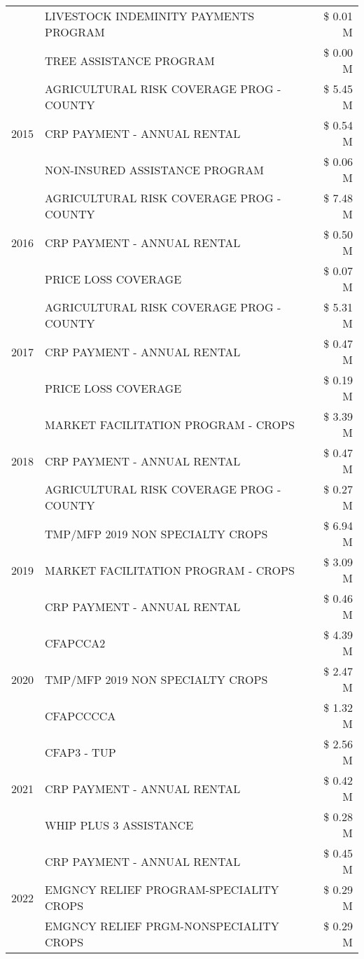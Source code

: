 \begin{tabular}{llr}
 & LIVESTOCK INDEMINITY PAYMENTS PROGRAM & \$ 0.01 M \\
 & TREE ASSISTANCE PROGRAM & \$ 0.00 M \\
\cline{1-3}
\multirow[t]{3}{*}{2015} & AGRICULTURAL RISK COVERAGE PROG - COUNTY & \$ 5.45 M \\
 & CRP PAYMENT - ANNUAL RENTAL & \$ 0.54 M \\
 & NON-INSURED ASSISTANCE PROGRAM & \$ 0.06 M \\
\cline{1-3}
\multirow[t]{3}{*}{2016} & AGRICULTURAL RISK COVERAGE PROG - COUNTY & \$ 7.48 M \\
 & CRP PAYMENT - ANNUAL RENTAL & \$ 0.50 M \\
 & PRICE LOSS COVERAGE & \$ 0.07 M \\
\cline{1-3}
\multirow[t]{3}{*}{2017} & AGRICULTURAL RISK COVERAGE PROG - COUNTY & \$ 5.31 M \\
 & CRP PAYMENT - ANNUAL RENTAL & \$ 0.47 M \\
 & PRICE LOSS COVERAGE & \$ 0.19 M \\
\cline{1-3}
\multirow[t]{3}{*}{2018} & MARKET FACILITATION PROGRAM - CROPS & \$ 3.39 M \\
 & CRP PAYMENT - ANNUAL RENTAL & \$ 0.47 M \\
 & AGRICULTURAL RISK COVERAGE PROG - COUNTY & \$ 0.27 M \\
\cline{1-3}
\multirow[t]{3}{*}{2019} & TMP/MFP 2019 NON SPECIALTY CROPS & \$ 6.94 M \\
 & MARKET FACILITATION PROGRAM - CROPS & \$ 3.09 M \\
 & CRP PAYMENT - ANNUAL RENTAL & \$ 0.46 M \\
\cline{1-3}
\multirow[t]{3}{*}{2020} & CFAPCCA2 & \$ 4.39 M \\
 & TMP/MFP 2019 NON SPECIALTY CROPS & \$ 2.47 M \\
 & CFAPCCCCA & \$ 1.32 M \\
\cline{1-3}
\multirow[t]{3}{*}{2021} & CFAP3 - TUP & \$ 2.56 M \\
 & CRP PAYMENT - ANNUAL RENTAL & \$ 0.42 M \\
 & WHIP PLUS 3 ASSISTANCE & \$ 0.28 M \\
\cline{1-3}
\multirow[t]{3}{*}{2022} & CRP PAYMENT - ANNUAL RENTAL & \$ 0.45 M \\
 & EMGNCY RELIEF PROGRAM-SPECIALITY CROPS & \$ 0.29 M \\
 & EMGNCY RELIEF PRGM-NONSPECIALITY CROPS & \$ 0.29 M \\
\cline{1-3}
\bottomrule
\end{tabular}
